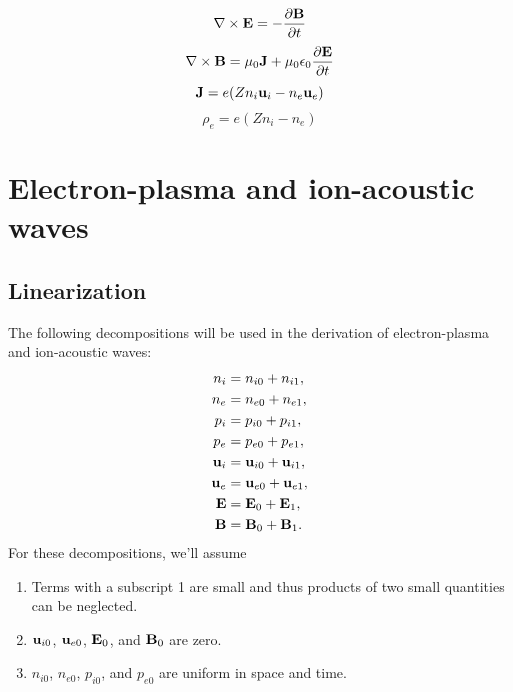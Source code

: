 \documentclass[a4paper,11pt]{report}
\begin{document}
\begin{equation}
    \label{eq:p_waves_maxwell_1}
    \nabla \times \mathbf{E} = -\frac{ \partial \mathbf{B}}{\partial t}
\end{equation}
\begin{equation}
    \label{eq:p_waves_maxwell_2}
    \nabla \times \mathbf{B} = \mu_0 \mathbf{J} + \mu_0 \epsilon_0 \frac{\partial \mathbf{E}}{\partial t}
\end{equation}
\begin{equation}
    \label{eq:p_waves_curr_density}
    \mathbf{J} = e (Z n_i \mathbf{u}_i - n_e \mathbf{u}_e)
\end{equation}
\begin{equation}
    \label{eq:p_waves_mass_density}
    \rho_e = e (Z n_i - n_e) 
\end{equation}

\chapter{Electron-plasma and ion-acoustic waves}
\section{Linearization}
\label{sec:p_waves_linearization}
The following decompositions will be used in the derivation of electron-plasma and ion-acoustic waves:
\begin{align}
    n_i &= n_{i0} + n_{i1}, \nonumber \\
    n_e &= n_{e0} + n_{e1}, \nonumber \\
    p_i &= p_{i0} + p_{i1}, \nonumber \\
    p_e &= p_{e0} + p_{e1}, \nonumber \\
    \mathbf{u}_i &= \mathbf{u}_{i0} + \mathbf{u}_{i1}, \nonumber \\
    \mathbf{u}_e &= \mathbf{u}_{e0} + \mathbf{u}_{e1}, \nonumber \\
    \mathbf{E} &= \mathbf{E}_0 + \mathbf{E}_1, \nonumber \\
    \mathbf{B} &= \mathbf{B}_0 + \mathbf{B}_1.
\end{align}
For these decompositions, we'll assume
\begin{enumerate}
    \item Terms with a subscript 1 are small and thus products of two small quantities can be neglected. \label{it:p_waves_assumption_1}
    \item $\mathbf{u}_{i0}$, $\mathbf{u}_{e0}$, $\mathbf{E}_0$, and $\mathbf{B}_0$ are zero. \label{it:p_waves_assumption_2}
    \item $n_{i0}$, $n_{e0}$, $p_{i0}$, and $p_{e0}$ are uniform in space and time. \label{it:p_waves_assumption_3}
\end{enumerate}
\end{document}
